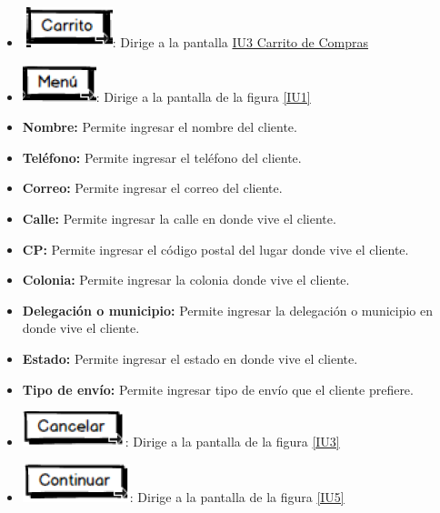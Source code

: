 \begin{itemize}
	
	\item \includegraphics[scale=0.500]{imagenes/iconografia/Carrito.png}: Dirige a la pantalla \hyperlink{IU3}{IU3 Carrito de Compras}
	\item \includegraphics[scale=0.500]{imagenes/iconografia/Menu.png}: Dirige a la pantalla de la figura \ref{IU1}
	\item \textbf{Nombre:} Permite ingresar el nombre del cliente.
	\item \textbf{Teléfono:} Permite ingresar el teléfono del cliente.
	\item \textbf{Correo:} Permite ingresar el correo del cliente.
	\item \textbf{Calle:} Permite ingresar la calle en donde vive el cliente.
	\item \textbf{CP:} Permite ingresar el código postal del lugar donde vive el cliente.
	\item \textbf{Colonia:} Permite ingresar la colonia donde vive el cliente.
	\item \textbf{Delegación o municipio:} Permite ingresar la delegación o municipio en donde vive el cliente.
	\item \textbf{Estado:} Permite ingresar el estado en donde vive el cliente.
	\item \textbf{Tipo de envío:} Permite ingresar tipo de envío que el cliente prefiere.
	\item \includegraphics[scale=0.500]{imagenes/iconografia/Cancelar.png}: Dirige a la pantalla de la figura \ref{IU3}
	\item \includegraphics[scale=0.500]{imagenes/iconografia/Continuar.png}: Dirige a la pantalla de la figura \ref{IU5}
	
\end{itemize}

